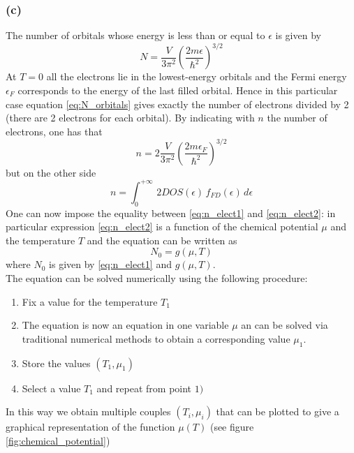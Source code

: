 \documentclass{article}
\begin{document}
\subsubsection*{(c)}
The number of orbitals whose energy is less than or equal to $\epsilon$ is given by 
\begin{equation}
    N = \frac{V}{3\pi^2} \left(\frac{2m\epsilon}{\hbar^2}\right)^{3/2}
    \label{eq:N_orbitals}
\end{equation}
At $T=0$ all the electrons lie in the lowest-energy orbitals and the Fermi energy $\epsilon_F$
corresponds to the energy of the last filled orbital. Hence in this particular case equation \ref{eq:N_orbitals}
gives exactly the number of electrons divided by 2 (there are 2 electrons for each orbital). By indicating with $n$ the number of electrons,
one has that 
\begin{equation}
    n = 2\frac{V}{3\pi^2} \left(\frac{2m\epsilon_F}{\hbar^2}\right)^{3/2}
    \label{eq:n_elect1}
\end{equation}
but on the other side
\begin{equation*}
    n = \int_0^{+\infty} \, 2DOS(\epsilon) \, f_{FD}(\epsilon) \, d\epsilon
    \label{eq:n_elect2}
\end{equation*}
One can now impose the equality between \ref{eq:n_elect1} and \ref{eq:n_elect2}: in particular expression \ref{eq:n_elect2} is a function of the chemical potential $\mu$ and the temperature $T$ and 
the equation can be written as 
\begin{equation*}
    N_0 = g(\mu, T)
\end{equation*}
where $N_0$ is given by \ref{eq:n_elect1} and $g(\mu, T)$. \\
The equation can be solved numerically using the following procedure:
\begin{enumerate}
    \item Fix a value for the temperature $T_1$
    \item The equation is now an equation in one variable $\mu$ an can be solved via traditional numerical methods to obtain a corresponding value $\mu_1$.
    \item Store the values $(T_1, \mu_1)$
    \item Select a value $T_1$ and repeat from point $1)$
\end{enumerate}
In this way we obtain multiple couples $(T_i, \mu_i)$ that can be plotted to give a graphical representation of the function $\mu(T)$ (see figure \ref{fig:chemical_potential})
\end{document}
